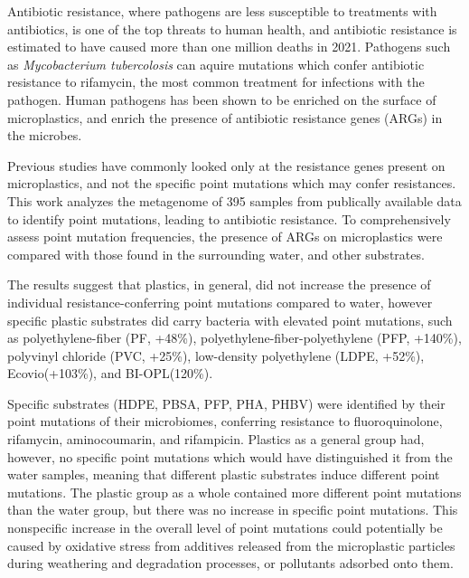 % 
Antibiotic resistance, where pathogens are less susceptible to treatments with antibiotics, is one of the top threats to human health, and antibiotic resistance is estimated to have caused more than one million deaths in 2021. 
Pathogens such as \emph{Mycobacterium tubercolosis} can aquire mutations which confer antibiotic resistance to rifamycin, the most common treatment for infections with the pathogen. 
Human pathogens has been shown to be enriched on the surface of microplastics, and enrich the presence of antibiotic resistance genes (ARGs) in the microbes.

Previous studies have commonly looked only at the resistance genes present on microplastics, and not the specific point mutations which may confer resistances.
This work analyzes the metagenome of 395 samples from publically available data to identify point mutations, leading to antibiotic resistance. 
To comprehensively assess point mutation frequencies, the presence of ARGs on microplastics were compared with those found in the surrounding water, and other substrates.

The results suggest that plastics, in general, did not increase the presence of individual resistance-conferring point mutations compared to water,
however specific plastic substrates did carry bacteria with elevated point mutations, such as polyethylene-fiber (PF, +48\%), polyethylene-fiber-polyethylene (PFP, +140\%), polyvinyl chloride (PVC, +25\%), low-density polyethylene (LDPE, +52\%), Ecovio(+103\%), and BI-OPL(120\%). 

Specific substrates (HDPE, PBSA, PFP, PHA, PHBV) were identified by their point mutations of their microbiomes, conferring resistance to fluoroquinolone, rifamycin, aminocoumarin, and rifampicin.
Plastics as a general group had, however, no specific point mutations which would have distinguished it from the water samples, meaning that different plastic substrates induce different point mutations. 
The plastic group as a whole contained more different point mutations than the water group, but there was no increase in specific point mutations. 
This nonspecific increase in the overall level of point mutations could potentially be caused by oxidative stress from additives released from the microplastic particles during weathering and degradation processes, or pollutants adsorbed onto them.

